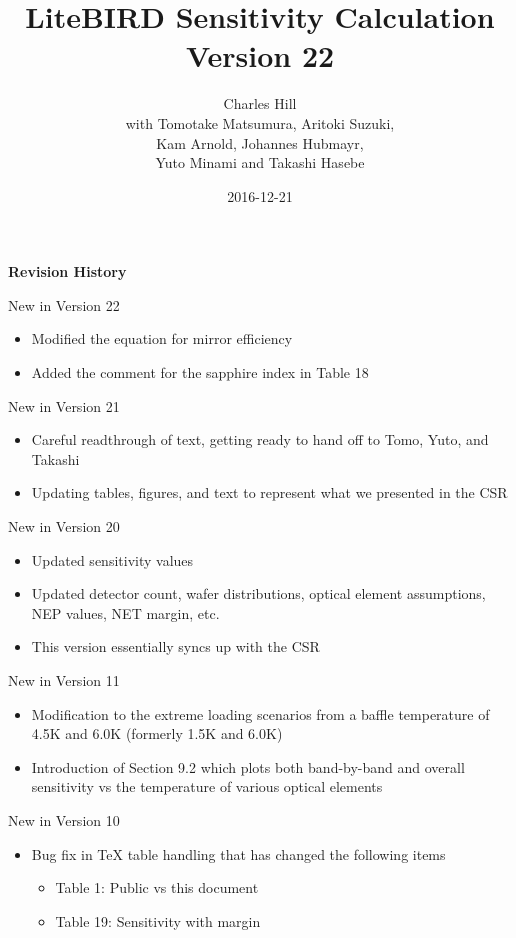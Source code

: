 \documentclass[12pt, titlepage]{article} %
\title{LiteBIRD Sensitivity Calculation \\ Version 22}
\author{Charles Hill \\ with Tomotake Matsumura, Aritoki Suzuki,  \\ Kam Arnold, Johannes Hubmayr, \\ Yuto Minami and Takashi Hasebe}
\date{2016-12-21} %
\begin{document}
\maketitle


\clearpage

\begin{center}
\fontsize{24}{12}
\textbf{Revision History}  \\
\vspace{10mm}
\end{center}
\fontsize{12}{12}

New in Version 22
\begin{itemize}
	\item Modified the equation for mirror efficiency
	\item Added the comment for the sapphire index in Table 18 
\end{itemize}

New in Version 21
\begin{itemize}
	\item Careful readthrough of text, getting ready to hand off to Tomo, Yuto, and Takashi
	\item Updating tables, figures, and text to represent what we presented in the CSR
\end{itemize}

New in Version 20
\begin{itemize}
	\item Updated sensitivity values
	\item Updated detector count, wafer distributions, optical element assumptions, NEP values, NET margin, etc.
	\item This version essentially syncs up with the CSR
\end{itemize}

New in Version 11
\begin{itemize}
	\item Modification to the extreme loading scenarios from a baffle temperature of 4.5K and 6.0K (formerly 1.5K and 6.0K)
	\item Introduction of Section 9.2 which plots both band-by-band and overall sensitivity vs the temperature of various optical elements
\end{itemize}

New in Version 10
\begin{itemize}
	\item Bug fix in TeX table handling that has changed the following items
		\begin{itemize}
			\item Table 1: Public vs this document
			\item Table 19: Sensitivity with margin
		\end{itemize}
\end{itemize}
\end{document}
